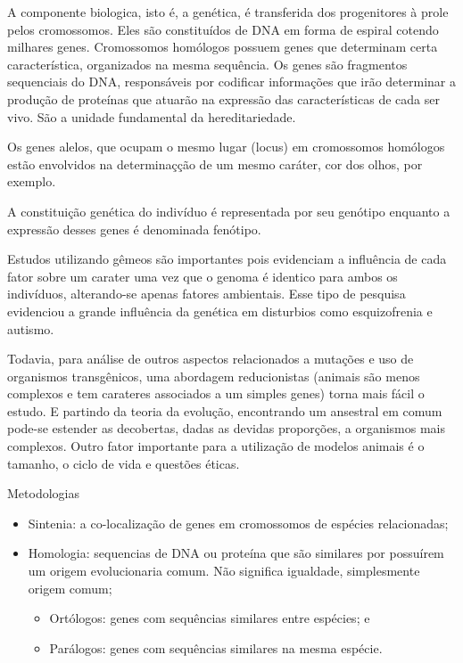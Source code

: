 \documentclass[
	article,			%
	12pt,				%
	oneside,			%
	a4paper,			%
	english,			%
	brazil,				%
	sumario=tradicional
	]{abntex2}
\begin{document}
A componente biologica, isto é, a genética, é transferida dos progenitores à prole pelos cromossomos.
Eles são constituídos de DNA em forma de espiral cotendo milhares genes.
Cromossomos homólogos possuem genes que determinam certa característica, organizados na mesma sequência. Os genes são  fragmentos sequenciais do DNA, responsáveis por codificar informações que irão determinar a produção de proteínas que atuarão na expressão das características de cada ser vivo. São a unidade fundamental da hereditariedade.

Os genes alelos, que ocupam o mesmo lugar (locus) em cromossomos homólogos estão envolvidos na determinaçção de um mesmo caráter, cor dos olhos, por exemplo.

A constituição genética do indivíduo é representada por seu genótipo enquanto a expressão desses genes é denominada fenótipo.




Estudos utilizando gêmeos são importantes pois evidenciam a influência de cada fator sobre um carater uma vez que o genoma é identico para ambos os indivíduos, alterando-se apenas fatores ambientais. Esse tipo de pesquisa evidenciou a grande influência da genética em disturbios como esquizofrenia e autismo.

Todavia, para análise de outros aspectos relacionados a mutações e uso de organismos transgênicos, uma abordagem reducionistas (animais são menos complexos e tem carateres associados a um simples genes) torna mais fácil o estudo. E partindo da teoria da evolução, encontrando um ansestral em comum pode-se estender as decobertas, dadas as devidas proporções, a organismos mais complexos. Outro fator importante para a utilização de modelos animais é o tamanho, o ciclo de vida e questões éticas.

Metodologias
\begin{itemize}
    \item Sintenia:	a	co-localização	de	genes	em cromossomos	de	espécies relacionadas;
    \item Homologia:	sequencias	de	DNA	ou proteína	que	são similares	por	 possuírem	um	origem	evolucionaria comum. Não significa igualdade, simplesmente origem comum;
    \begin{itemize}
            \item Ortólogos:	genes	com	sequências	 similares	entre espécies; e
            \item Parálogos: genes	com	sequências	 similares	na	mesma espécie.
    \end{itemize}
\end{itemize}
	
\end{document}
